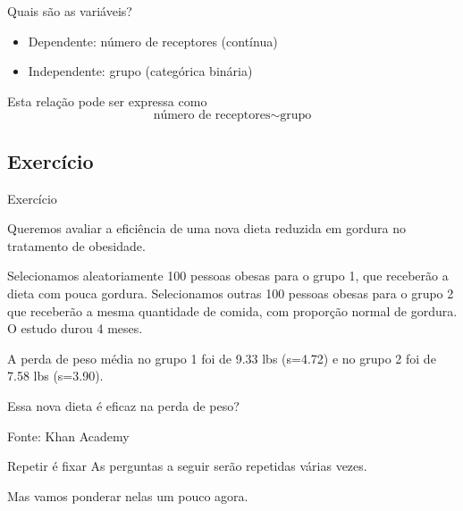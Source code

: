 \documentclass{beamer}
\begin{document}
\begin{frame}{Quais são as variáveis?}
  \begin{itemize}
  \item Dependente: número de receptores (contínua)
  \item Independente: grupo (categórica binária)
  \end{itemize}
  \vfill
  \begin{block}{Esta relação pode ser expressa como}
    \begin{displaymath}
      \text{número de receptores} \sim \text{grupo}
    \end{displaymath}
  \end{block}
\end{frame}

\subsection{Exercício}

\begin{frame}{Exercício}
  \begin{exampleblock}{}
    \small
    Queremos avaliar a eficiência de uma nova dieta reduzida em
    gordura no tratamento de obesidade.

    \bigskip
    {\footnotesize
      Selecionamos aleatoriamente 100 pessoas obesas para o grupo 1, que receberão a dieta com pouca gordura.
      Selecionamos outras 100 pessoas obesas para o grupo 2 que receberão a mesma quantidade de comida, com proporção normal de gordura.
      O estudo durou 4 meses.
    }

    \bigskip
    \begin{exampleblock}{}
      \footnotesize
      A perda de peso média no grupo 1 foi de 9.33 lbs
      (s=4.72) e no grupo 2 foi de 7.58 lbs (s=3.90).
    \end{exampleblock}
  \end{exampleblock}
  \begin{block}{}
    Essa nova dieta é eficaz na perda de peso?
  \end{block}
  \hfill {\footnotesize Fonte: Khan Academy}
\end{frame}

\begin{frame}
  \begin{block}{Repetir é fixar}
    As perguntas a seguir serão repetidas várias vezes.

    \bigskip
    Mas vamos ponderar nelas um pouco agora.
  \end{block}
\end{frame}
\end{document}
